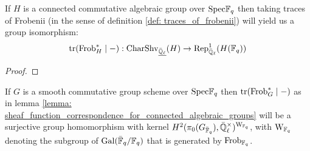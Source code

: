             \begin{lemma} \label{lemma: sheaf_function_correspondence_for_connected_algebraic_groups}
                \cite[Proposition 1.14]{cunningham_roe_function_sheaf_dictionary_quasi_characters_p_adic_tori} If $H$ is a connected commutative algebraic group over $\mathrm{Spec} \mathbb{F}_q$ then taking traces of Frobenii (in the sense of definition \ref{def: traces_of_frobenii}) will yield us a group isomorphism:
                    $$\operatorname{tr}(\mathrm{Frob}_H^* \mid -): \mathrm{Char}\mathrm{Shv}_{\underline{\bar{\mathbb{Q}}_{\ell}}}(H) \to \mathrm{Rep}_{\bar{\mathbb{Q}}_{\ell}}^1(H(\mathbb{F}_q))$$
            \end{lemma}
            \begin{lemma} \label{lemma: sheaf_function_correspondence_for_etale_commutative_group_schemes}
                \cite[Proposition 2.7]{cunningham_roe_function_sheaf_dictionary_quasi_characters_p_adic_tori} 
            \end{lemma}
                \begin{proof}
                    
                \end{proof}
            \begin{theorem} \label{theorem: sheaf_function_correspondence_for_smooth_groups}
                \cite[Theorem 3.6]{cunningham_roe_function_sheaf_dictionary_quasi_characters_p_adic_tori} If $G$ is a smooth commutative group scheme over $\mathrm{Spec} \mathbb{F}_q$ then $\operatorname{tr}(\mathrm{Frob}_G^* \mid -)$ as in lemma \ref{lemma: sheaf_function_correspondence_for_connected_algebraic_groups} will be a surjective group homomorphism with kernel $H^2(\pi_0(G_{\bar{\F}_q}), \bar{\Q}_{\ell}^{\x})^{\rmW_{\F_q}}$, with $\mathrm{W}_{\mathbb{F}_q}$ denoting the subgroup of $\mathrm{Gal}(\bar{\mathbb{F}}_q/\mathbb{F}_q)$ that is generated by $\mathrm{Frob}_{\mathbb{F}_q}$.
            \end{theorem}
